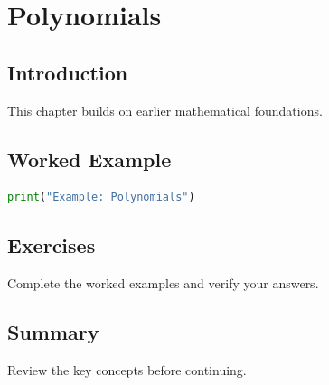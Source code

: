 \chapter{Polynomials}
\label{chap:vol4-7}



\section{Introduction}
This chapter builds on earlier mathematical foundations.

\section{Worked Example}
\begin{lstlisting}[language=Python]
print("Example: Polynomials")
\end{lstlisting}

\section{Exercises}
\begin{exercise}
Complete the worked examples and verify your answers.
\end{exercise}

\section{Summary}
Review the key concepts before continuing.
